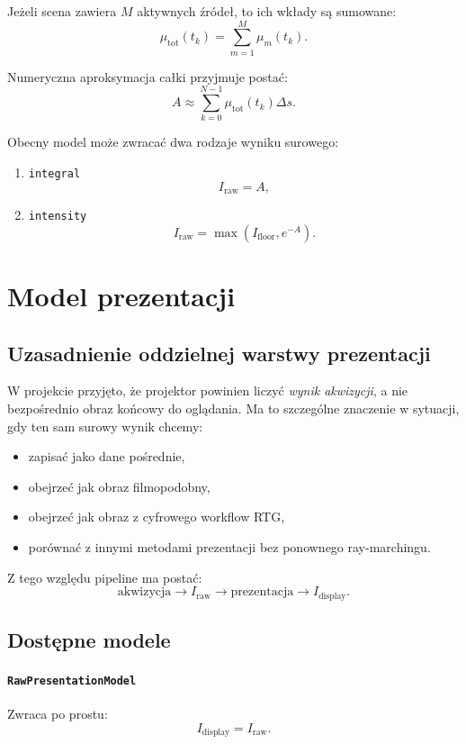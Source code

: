\documentclass[12pt,a4paper]{article}
\begin{document}
Jeżeli scena zawiera \(M\) aktywnych źródeł, to ich wkłady są sumowane:
\[
  \mu_{\mathrm{tot}}(t_k) =
  \sum_{m=1}^{M} \mu_m(t_k).
\]

Numeryczna aproksymacja całki przyjmuje postać:
\[
  A \approx \sum_{k=0}^{N-1}\mu_{\mathrm{tot}}(t_k)\Delta s.
\]

Obecny model może zwracać dwa rodzaje wyniku surowego:
\begin{enumerate}[label=\alph*)]
  \item \texttt{integral}
  \[
    I_{\mathrm{raw}} = A,
  \]
  \item \texttt{intensity}
  \[
    I_{\mathrm{raw}} = \max\!\left(I_{\mathrm{floor}}, e^{-A}\right).
  \]
\end{enumerate}

\section{Model prezentacji}

\subsection{Uzasadnienie oddzielnej warstwy prezentacji}

W projekcie przyjęto, że projektor powinien liczyć \emph{wynik akwizycji},
a nie bezpośrednio obraz końcowy do oglądania. Ma to szczególne znaczenie w sytuacji,
gdy ten sam surowy wynik chcemy:
\begin{itemize}
  \item zapisać jako dane pośrednie,
  \item obejrzeć jak obraz filmopodobny,
  \item obejrzeć jak obraz z cyfrowego workflow RTG,
  \item porównać z innymi metodami prezentacji bez ponownego ray-marchingu.
\end{itemize}

Z tego względu pipeline ma postać:
\[
  \text{akwizycja} \longrightarrow I_{\mathrm{raw}}
  \longrightarrow \text{prezentacja}
  \longrightarrow I_{\mathrm{display}}.
\]

\subsection{Dostępne modele}

\paragraph{\texttt{RawPresentationModel}}
Zwraca po prostu:
\[
  I_{\mathrm{display}} = I_{\mathrm{raw}}.
\]
\end{document}
